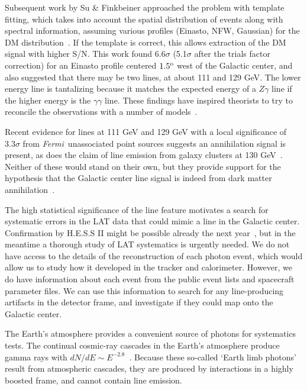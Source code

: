 \documentclass[aps,twocolumn,prd,superscriptaddress,showpacs,nofootinbib,fixfloat]{revtex4}
\newcommand{\Fermi}{{\slshape Fermi}}
\newcommand{\degree}{^{\rm o}}
\begin{document}
Subsequent work by Su \& Finkbeiner approached the problem
with template fitting, which takes into account the spatial
distribution of events along with spectral information,
assuming various profiles (Einasto, NFW, Gaussian) for the
DM distribution~\citep{linepaper}.  If the template is
correct, this allows extraction of the DM signal with
higher S/N.  This work found 6.6$\sigma$ (5.1$\sigma$ after
the trials factor correction) for an Einasto profile
centered $1.5\degree$ west of the Galactic center, and also
suggested that there may be two lines, at about 111 and 129
GeV.  The lower energy line is tantalizing because it
matches the expected energy of a $Z\gamma$ line if the
higher energy is the $\gamma\gamma$ line.  These findings
have inspired theorists to try to reconcile the observations
with a number of models~\citep{Dudas:2012, Choi:2012,
  Kyae:2012, Lee:2012, Rajaraman:2012, Acharya:2012,
  Garny:2012, Buckley:2012, Chu:2012, Kang:2012,
  Buchmuller:2012, Heo:2012, Park:2012, Tulin:2012,
  Cline:2012, Weiner:2012}.

Recent evidence for lines at 111 GeV and 129 GeV with a
local significance of $3.3\sigma$ from \Fermi\ unassociated
point sources suggests an annihilation signal is present, as
does the claim of line emission from galaxy clusters at 130
GeV~\cite{Hektor:2012kc}.  Neither of these would stand on
their own, but they provide support for the hypothesis that
the Galactic center line signal is indeed from dark matter
annihilation~\cite{doubleline}.

The high statistical significance of the line
feature motivates a search for systematic errors in the
LAT data that could mimic a line in the Galactic center.
Confirmation by H.E.S.S II might be possible already the next
year~\cite{Bergstrom:2012}, but in the meantime a thorough
study of LAT systematics is urgently needed.  We do not have
access to the details of the reconstruction of each photon
event, which would allow us to study how it developed in the
tracker and calorimeter.  However, we do have information
about each event from the public event lists and spacecraft
parameter files.  We can use this information to search for
any line-producing artifacts in the detector frame, and
investigate if they could map onto the Galactic center.

The Earth's atmosphere provides a convenient source of
photons for systematics tests.  The continual cosmic-ray
cascades in the Earth's atmosphere produce gamma rays with
$dN/dE \sim E^{-2.8}$~\citep{FermiLimb}.  Because these
so-called `Earth limb photons' result from atmospheric
cascades, they are produced by interactions in a highly
boosted frame, and cannot contain line emission.
\end{document}
